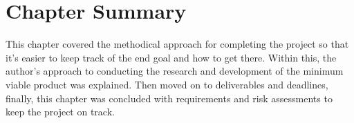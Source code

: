 \section{Chapter Summary}

This chapter covered the methodical approach for completing the project so that it's easier to keep track of the end goal and how to get there. Within this, the author’s approach to conducting the research and development of the minimum viable product was explained. Then moved on to deliverables and deadlines, finally, this chapter was concluded with requirements and risk assessments to keep the project on track.